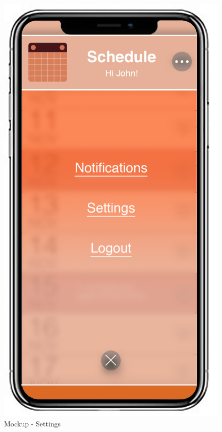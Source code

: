\begin{figure}[H]
	\begin{minipage}{0.5\textwidth}
		\centerline{\includegraphics[width=0.3\paperwidth]{Images/Settings}}
		\caption{Mockup - Settings}
	\end{minipage}
	\begin{minipage}{0.5\textwidth}

\end{minipage}
\end{figure}
